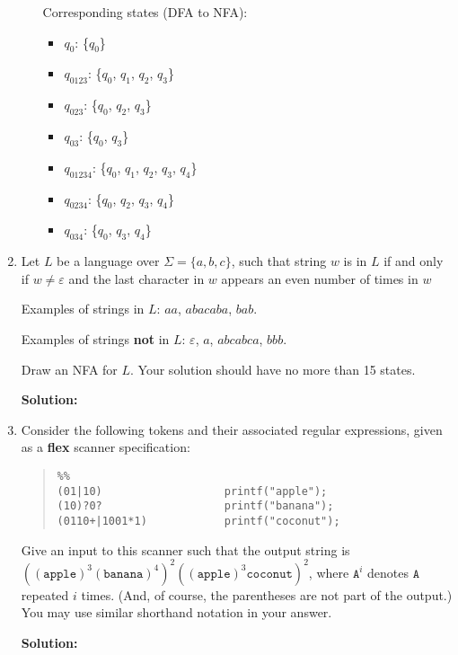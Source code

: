 \documentclass[11pt]{article}
\renewcommand{\epsilon}{\varepsilon}
\begin{document}
\begin{enumerate}
\begin{enumerate}
    Corresponding states (DFA to NFA):
    \begin{itemize}
        \item $q_0$: \{{$q_0$}\}
        \item $q_{0123}$: \{{$q_0$, $q_1$, $q_2$, $q_3$}\}
        \item $q_{023}$: \{{$q_0$, $q_2$, $q_3$}\}
        \item $q_{03}$: \{{$q_0$, $q_3$}\}
        \item $q_{01234}$: \{{$q_0$, $q_1$, $q_2$, $q_3$, $q_4$}\}
        \item $q_{0234}$: \{{$q_0$, $q_2$, $q_3$, $q_4$}\}
        \item $q_{034}$: \{{$q_0$, $q_3$, $q_4$}\}
    \end{itemize}
\end{enumerate}

\newpage

\item Let $L$ be a language over $\Sigma = \{a, b, c\}$, such that string $w$ is in $L$ if and only if $w\neq\epsilon$ and the last character in $w$ appears an even number of times in $w$

Examples of strings in $L$: $aa$, $abacaba$, $bab$.

Examples of strings \textbf{not} in $L$: $\epsilon$, $a$, $abcabca$, $bbb$.

Draw an NFA for $L$.  Your solution should have no more than 15 states.

\textbf{Solution:}

\newpage

\item Consider the following tokens and their associated regular expressions, given as a \textbf{flex} scanner specification:
\begin{quote}
\begin{lstlisting}
%%
(01|10)                   printf("apple");
(10)?0?                   printf("banana");
(0110+|1001*1)            printf("coconut");
\end{lstlisting}
\end{quote}
Give an input to this scanner such that the output string is $((\mathtt{apple})^3 (\mathtt{banana})^4)^2 ((\mathtt{apple})^3\mathtt{coconut})^2$, where $\mathtt{A}^i$ denotes $\mathtt{A}$ repeated $i$ times.   (And, of course, the parentheses are not part of the output.)  You may use similar shorthand notation in your answer.

\textbf{Solution:}



\end{enumerate}
\end{document}
